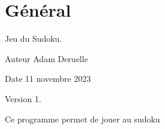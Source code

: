 \chapter{Général}
\hypertarget{_g_xC3_xA9n_xC3_xA9ral}{}\label{_g_xC3_xA9n_xC3_xA9ral}
Jeu du Sudoku.

\begin{DoxyAuthor}{Auteur}
Adam Deruelle 
\end{DoxyAuthor}
\begin{DoxyDate}{Date}
11 novembre 2023 
\end{DoxyDate}
\begin{DoxyVersion}{Version}
1.
\end{DoxyVersion}
Ce programme permet de jouer au sudoku 